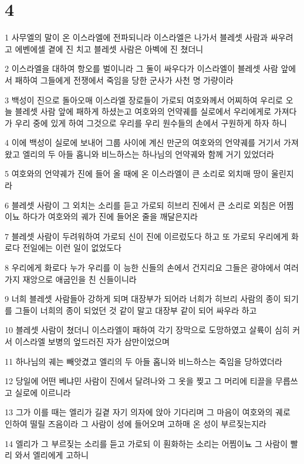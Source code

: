 \chapter{4}

\par 1 사무엘의 말이 온 이스라엘에 전파되니라 이스라엘은 나가서 블레셋 사람과 싸우려고 에벤에셀 곁에 진 치고 블레셋 사람은 아벡에 진 쳤더니
\par 2 이스라엘을 대하여 항오를 벌이니라 그 둘이 싸우다가 이스라엘이 블레셋 사람 앞에서 패하여 그들에게 전쟁에서 죽임을 당한 군사가 사천 명 가량이라
\par 3 백성이 진으로 돌아오매 이스라엘 장로들이 가로되 여호와께서 어찌하여 우리로 오늘 블레셋 사람 앞에 패하게 하셨는고 여호와의 언약궤를 실로에서 우리에게로 가져다가 우리 중에 있게 하여 그것으로 우리를 우리 원수들의 손에서 구원하게 하자 하니
\par 4 이에 백성이 실로에 보내어 그룹 사이에 계신 만군의 여호와의 언약궤를 거기서 가져 왔고 엘리의 두 아들 홉니와 비느하스는 하나님의 언약궤와 함께 거기 있었더라
\par 5 여호와의 언약궤가 진에 들어 올 때에 온 이스라엘이 큰 소리로 외치매 땅이 울린지라
\par 6 블레셋 사람이 그 외치는 소리를 듣고 가로되 히브리 진에서 큰 소리로 외침은 어찜이뇨 하다가 여호와의 궤가 진에 들어온 줄을 깨달은지라
\par 7 블레셋 사람이 두려워하여 가로되 신이 진에 이르렀도다 하고 또 가로되 우리에게 화로다 전일에는 이런 일이 없었도다
\par 8 우리에게 화로다 누가 우리를 이 능한 신들의 손에서 건지리요 그들은 광야에서 여러가지 재앙으로 애굽인을 친 신들이니라
\par 9 너희 블레셋 사람들아 강하게 되며 대장부가 되어라 너희가 히브리 사람의 종이 되기를 그들이 너희의 종이 되었던 것 같이 말고 대장부 같이 되어 싸우라 하고
\par 10 블레셋 사람이 쳤더니 이스라엘이 패하여 각기 장막으로 도망하였고 살륙이 심히 커서 이스라엘 보병의 엎드러진 자가 삼만이었으며
\par 11 하나님의 궤는 빼앗겼고 엘리의 두 아들 홉니와 비느하스는 죽임을 당하였더라
\par 12 당일에 어떤 베냐민 사람이 진에서 달려나와 그 옷을 찢고 그 머리에 티끌을 무릅쓰고 실로에 이르니라
\par 13 그가 이를 때는 엘리가 길곁 자기 의자에 앉아 기다리며 그 마음이 여호와의 궤로 인하여 떨릴 즈음이라 그 사람이 성에 들어오며 고하매 온 성이 부르짖는지라
\par 14 엘리가 그 부르짖는 소리를 듣고 가로되 이 훤화하는 소리는 어찜이뇨 그 사람이 빨리 와서 엘리에게 고하니
